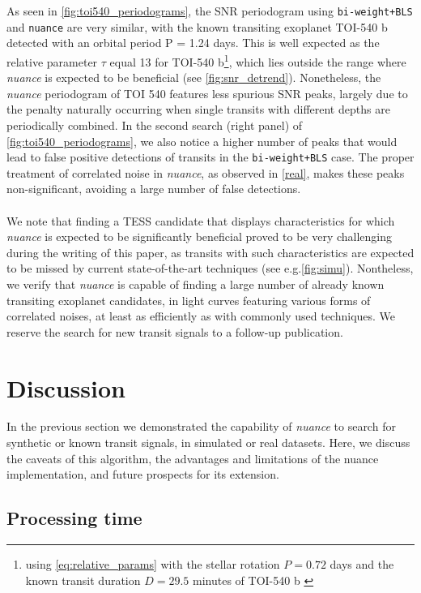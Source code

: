 \documentclass[modern]{aastex631}
\newcommand{\nuancemethod}{\textit{nuance}}
\newcommand{\nuance}{\nuancemethod{}}
\newcommand{\nuancecode}{\textsf{nuance}}
\begin{document}
As seen in \autoref{fig:toi540_periodograms}, the SNR periodogram using \texttt{bi-weight+BLS} and \texttt{nuance} are very similar, with the known transiting exoplanet TOI-540 b detected with an orbital period P = 1.24 days. This is well expected as the relative parameter $\tau$ equal 13 for TOI-540 b\footnote{using \autoref{eq:relative_params} with the stellar rotation $P=0.72$ days and the known transit duration $D=29.5$ minutes of TOI-540 b \citep{TOI540}}, which lies outside the range where \nuancemethod{} is expected to be beneficial (see \autoref{fig:snr_detrend}). Nonetheless, the \nuance{} periodogram of TOI 540 features less spurious SNR peaks, largely due to the penalty naturally occurring when single transits with different depths are periodically combined. In the second search (right panel) of \autoref{fig:toi540_periodograms}, we also notice a higher number of peaks that would lead to false positive detections of transits in the \texttt{bi-weight+BLS} case. The proper treatment of correlated noise in \nuance{}, as observed in \autoref{real}, makes these peaks non-significant, avoiding a large number of false detections.\\\\
We note that finding a TESS candidate that displays characteristics for which \nuance{} is expected to be significantly beneficial proved to be very challenging during the writing of this paper, as transits with such characteristics are expected to be missed by current state-of-the-art techniques (see e.g.\;\autoref{fig:simu}). Nontheless, we verify that \nuancemethod{} is capable of finding a large number of already known transiting exoplanet candidates, in light curves featuring various forms of correlated noises, at least as efficiently as with commonly used techniques. We reserve the search for new transit signals to a follow-up publication.

\newpage
\section{Discussion}\label{discussion}

In the previous section we demonstrated the capability of \nuance{} to search for synthetic or known transit signals, in simulated or real datasets. Here, we discuss the caveats of this algorithm, the advantages and limitations of the \nuancecode{} implementation, and future prospects for its extension.

\subsection{Processing time}
\end{document}
